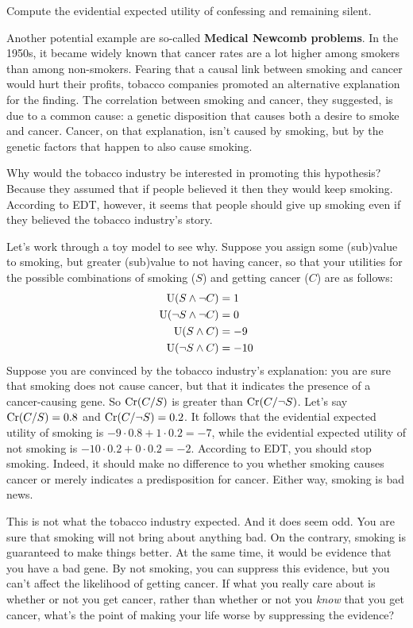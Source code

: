 \begin{exercise}{1}
  Compute the evidential expected utility of confessing and remaining
  silent. 
\end{exercise}

Another potential example are so-called \textbf{Medical Newcomb problems}. In
the 1950s, it became widely known that cancer rates are a lot higher among
smokers than among non-smokers. Fearing that a causal link between smoking and
cancer would hurt their profits, tobacco companies promoted an alternative
explanation for the finding. The correlation between smoking and cancer, they
suggested, is due to a common cause: a genetic disposition that causes both a
desire to smoke and cancer. Cancer, on that explanation, isn't caused by
smoking, but by the genetic factors that happen to also cause smoking.

Why would the tobacco industry be interested in promoting this hypothesis?
Because they assumed that if people believed it then they would keep smoking.
According to EDT, however, it seems that people should give up smoking even if
they believed the tobacco industry's story.

Let's work through a toy model to see why. Suppose you assign some (sub)value to
smoking, but greater (sub)value to not having cancer, so that your utilities for
the possible combinations of smoking ($S$) and getting cancer ($C$) are as
follows:
%
\begin{align*}
\text{U}(S \land \neg C) &= 1\\
\text{U}(\neg S \land \neg C) &= 0\\
\text{U}(S \land C) &= -9\\
\text{U}(\neg S \land C) &= -10
\end{align*}
Suppose you are convinced by the tobacco industry's explanation: you are sure
that smoking does not cause cancer, but that it indicates the presence of a
cancer-causing gene. So $\text{Cr}(C/S)$ is greater than $\text{Cr}(C/\neg S)$. Let's say
$\text{Cr}(C/S) = 0.8$ and $\text{Cr}(C/\neg S) = 0.2$. It follows that the evidential
expected utility of smoking is $-9 \cdot 0.8 + 1 \cdot 0.2 = -7$, while the
evidential expected utility of not smoking is
$-10 \cdot 0.2 + 0 \cdot 0.2 = -2$. According to EDT, you should stop smoking.
Indeed, it should make no difference to you whether smoking causes cancer or
merely indicates a predisposition for cancer. Either way, smoking is bad news.

This is not what the tobacco industry expected. And it does seem odd. You are
sure that smoking will not bring about anything bad. On the contrary, smoking is
guaranteed to make things better. At the same time, it would be evidence that
you have a bad gene. By not smoking, you can suppress this evidence, but you
can't affect the likelihood of getting cancer. If what you really care about is
whether or not you get cancer, rather than whether or not you \emph{know} that
you get cancer, what's the point of making your life worse by suppressing the
evidence?

